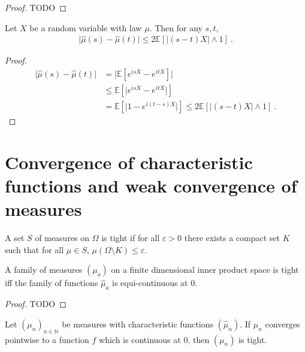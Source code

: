 \begin{proof}
TODO
\end{proof}

\begin{lemma}\label{lem:abs_sub_charFun}
Let $X$ be a random variable with law $\mu$. Then for any $s, t$,
\begin{align*}
\vert \hat{\mu}(s) - \hat{\mu}(t) \vert
\le 2 \mathbb{E}\left[ \left\vert (s - t) X\right\vert \wedge 1\right]
\: .
\end{align*}
\end{lemma}

\begin{proof}
\begin{align*}
\vert \hat{\mu}(s) - \hat{\mu}(t) \vert
&= \vert \mathbb{E}\left[e^{isX} - e^{itX}\right] \vert
\\
&\le \mathbb{E}\left[\vert e^{isX} - e^{itX} \vert\right]
\\
&= \mathbb{E}\left[\vert 1 - e^{i(t - s)X} \vert\right]
\le 2 \mathbb{E}\left[ \left\vert (s - t) X\right\vert \wedge 1\right]
\: .
\end{align*}
\end{proof}

\section{Convergence of characteristic functions and weak convergence of measures}


\begin{definition}\label{def:tight}
A set $S$ of measures on $\Omega$ is tight if for all $\varepsilon > 0$ there exists a compact set $K$ such that for all $\mu \in S$, $\mu(\Omega \setminus K) \le \varepsilon$.
\end{definition}

\begin{lemma}\label{lem:tight_iff_charFun_equiContinuous}
A family of measures $(\mu_a)$ on a finite dimensional inner product space is tight iff the family of functions $\hat{\mu}_a$ is equi-continuous at 0.
\end{lemma}

\begin{proof}
TODO
\end{proof}

\begin{lemma}\label{lem:tight_of_tendsto_charFun}
Let $(\mu_n)_{n \in \mathbb{N}}$ be measures with characteristic functions $(\hat{\mu}_n)$. If $\hat{\mu}_n$ converges pointwise to a function $f$ which is continuous at 0, then $(\mu_n)$ is tight.
\end{lemma}

